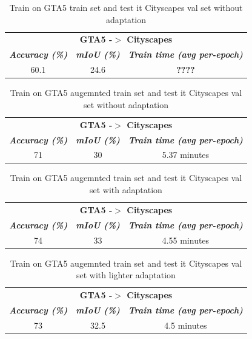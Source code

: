 \documentclass[conference]{IEEEtran}
\begin{document}
\begin{table}[tb]
\caption{Train on GTA5 train set and test it Cityscapes val set without adaptation}
\begin{center}
\begin{tabular}{|c|c|c|}
\hline
\multicolumn{3}{|c|}{\textbf{GTA5 -$>$ Cityscapes}} \\
\cline{1-3} 
\textbf{\textit{Accuracy (\%)}}& \textbf{\textit{mIoU (\%)}}& \textbf{\textit{Train time (avg per-epoch)}} \\
\hline
60.1 & 24.6 & \textbf{????} \\
\hline
\end{tabular}
\label{GTATOCITYSCAPESNOADAP}
\end{center}
\end{table}

\begin{table}[tb]
\caption{Train on GTA5 augemnted train set and test it Cityscapes val set without adaptation}
\begin{center}
\begin{tabular}{|c|c|c|}
\hline
\multicolumn{3}{|c|}{\textbf{GTA5 -$>$ Cityscapes}} \\
\cline{1-3} 
\textbf{\textit{Accuracy (\%)}}& \textbf{\textit{mIoU (\%)}}& \textbf{\textit{Train time (avg per-epoch)}} \\
\hline
71 & 30 & 5.37 minutes \\
\hline
\end{tabular}
\label{GTATOCITYSCAPESNOADAPAUG}
\end{center}
\end{table}

\begin{table}[tb]
\caption{Train on GTA5 augemnted train set and test it Cityscapes val set with adaptation}
\begin{center}
\begin{tabular}{|c|c|c|}
\hline
\multicolumn{3}{|c|}{\textbf{GTA5 -$>$ Cityscapes}} \\
\cline{1-3} 
\textbf{\textit{Accuracy (\%)}}& \textbf{\textit{mIoU (\%)}}& \textbf{\textit{Train time (avg per-epoch)}} \\
\hline
74 & 33 & 4.55 minutes \\
\hline
\end{tabular}
\label{GTATOCITYSCAPESADAP}
\end{center}
\end{table}

\begin{table}[tb]
\caption{Train on GTA5 augemnted train set and test it Cityscapes val set with lighter adaptation}
\begin{center}
\begin{tabular}{|c|c|c|}
\hline
\multicolumn{3}{|c|}{\textbf{GTA5 -$>$ Cityscapes}} \\
\cline{1-3} 
\textbf{\textit{Accuracy (\%)}}& \textbf{\textit{mIoU (\%)}}& \textbf{\textit{Train time (avg per-epoch)}} \\
\hline
73& 32.5& 4.5 minutes\\
\hline
\end{tabular}
\label{GTATOCITYSCAPESADAPLIGHT}
\end{center}
\end{table}
\end{document}
